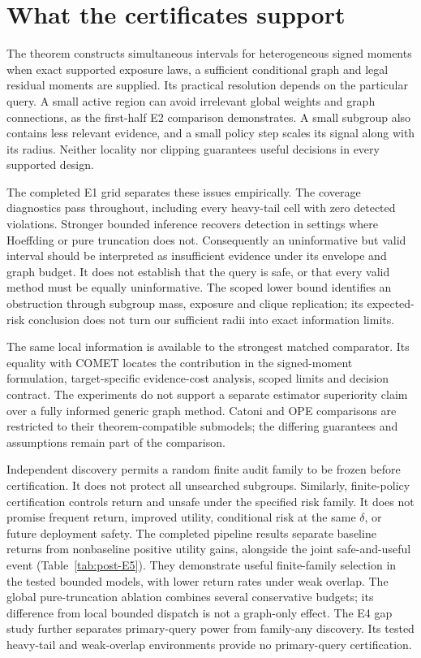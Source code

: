 \section{What the certificates support}

The theorem constructs simultaneous intervals for heterogeneous signed
moments when exact supported exposure laws, a sufficient conditional graph
and legal residual moments are supplied. Its practical resolution depends
on the particular query. A small active region can avoid irrelevant global
weights and graph connections, as the first-half E2 comparison demonstrates.
A small subgroup also contains less relevant evidence, and a small policy
step scales its signal along with its radius. Neither locality nor clipping
guarantees useful decisions in every supported design.

The completed E1 grid separates these issues empirically. The coverage
diagnostics pass throughout, including every heavy-tail cell with zero
detected violations. Stronger bounded inference recovers detection in
settings where Hoeffding or pure truncation does not. Consequently an
uninformative but valid interval should be interpreted as insufficient
evidence under its envelope and graph budget. It does not establish that
the query is safe, or that every valid method must be equally uninformative.
The scoped lower bound identifies an obstruction through subgroup mass,
exposure and clique replication; its expected-risk conclusion does not turn
our sufficient radii into exact information limits.

The same local information is available to the strongest matched comparator.
Its equality with COMET locates the contribution in the signed-moment
formulation, target-specific evidence-cost analysis, scoped limits and
decision contract. The experiments do not support a separate estimator
superiority claim over a fully informed generic graph method. Catoni and
OPE comparisons are restricted to their theorem-compatible submodels;
the differing guarantees and assumptions remain part of the comparison.

Independent discovery permits a random finite audit family to be frozen
before certification. It does not protect all unsearched subgroups.
Similarly, finite-policy certification controls return and unsafe under
the specified risk family. It does not promise frequent return, improved
utility, conditional risk at the same $\delta$, or future deployment safety.
The completed pipeline results separate baseline returns from nonbaseline
positive utility gains, alongside the joint safe-and-useful event
(Table~\ref{tab:post-E5}). They demonstrate useful finite-family selection
in the tested bounded models, with lower return rates under weak overlap.
The global pure-truncation ablation combines several conservative budgets;
its difference from local bounded dispatch is not a graph-only effect.
The E4 gap study further separates primary-query power from family-any
discovery. Its tested heavy-tail and weak-overlap environments provide no
primary-query certification.


